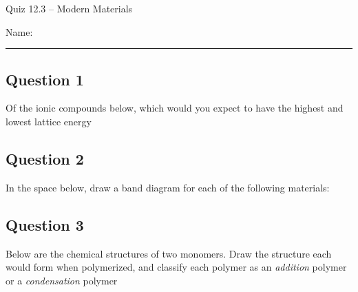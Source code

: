\documentclass[11pt, letterpaper]{memoir}
\begin{document}
	\begin{center}
		{\large	Quiz 12.3 -- Modern Materials}
	\end{center}
	{\large Name: \rule[-1mm]{4in}{.1pt} 
	
	\subsection*{Question 1}
  Of the ionic compounds below, which would you expect to have the highest and lowest lattice energy


	\subsection*{Question 2}
  In the space below, draw a band diagram for each of the following materials:


	\vspace{13em}
  \subsection*{Question 3}
  \noindent Below are the chemical structures of two monomers. Draw the structure each would form when polymerized, and classify each polymer as an \emph{addition} polymer or a \emph{condensation} polymer

}
\end{document}
